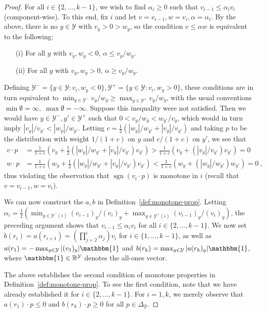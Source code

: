 \documentclass[11pt]{colt2019}
\newcommand{\reals}{\mathbb{R}}
\newcommand{\simplex}{\Delta_\Y}
\newcommand{\Y}{\mathcal{Y}}
\newcommand{\ones}{\mathbbm{1}}
\DeclareMathOperator*{\sgn}{sgn}
\begin{document}
\begin{proof}
  For all $i\in\{2,\ldots,k-1\}$, we wish to find $\alpha_i \geq 0$ such that $v_{i-1} \leq \alpha_i v_i$ (component-wise).
  To this end, fix $i$ and let $v = v_{i-1}, w = v_{i}, \alpha=\alpha_i$.
  By the above, there is no $y\in\Y$ with $v_y > 0 > w_y$, so the condition $v \leq \alpha w$ is equivalent to the following:
  \begin{enumerate}
  \item[(i)] For all $y$ with $v_y,w_y < 0$, $\alpha \leq v_y/w_y$.
  \item[(ii)] For all $y$ with $v_y,w_y > 0$, $\alpha \geq v_y/w_y$.
  \end{enumerate}
  Defining $\Y^- = \{y\in\Y: v_i,w_y < 0\}, \Y^+ = \{y\in\Y: v_i,w_y > 0\}$, these conditions are in turn equivalent to $\min_{y\in\Y^-} v_y/w_y \geq \max_{y\in\Y^+} v_y/w_y$, with the usual conventions $\min \emptyset = \infty,\; \max \emptyset = -\infty$.
  Suppose this inequality were not satisfied.
  Then we would have $y \in \Y^-,y'\in\Y^+$ such that $0 < v_y/w_y < w_{y'}/v_y$, which would in turn imply $|v_y|/v_{y'} < |w_y| / w_{y'}$.
  Letting $c = \tfrac 1 2 \left(|w_y| / w_{y'} + |v_y|/v_{y'}\right)$ and taking $p$ to be the distribution with weight $1/(1+c)$ on $y$ and $c/(1+c)$ on $y'$, we see that
  \begin{align*}
    v \cdot p &= \frac 1 {1+c} \left(v_y + \tfrac 1 2 (|w_y| / w_{y'} + |v_y|/v_{y'})v_{y'}\right) > \frac 1 {1+c} \left(v_y + (|v_y|/v_{y'})v_{y'}\right) = 0
    \\
    w \cdot p &= \frac 1 {1+c} \left(w_y + \tfrac 1 2 (|w_y| / w_{y'} + |v_y|/v_{y'})v_{y'}\right) < \frac 1 {1+c} \left(w_y + (|w_y|/w_{y'})w_{y'}\right) = 0~,
  \end{align*}
  thus violating the observation that $\sgn(v_i\cdot p)$ is monotone in $i$ (recall that $v = v_{i-1}, w = v_{i}$).

  We can now construct the $a,b$ in Definition~\ref{def:monotone-prop}.
  Letting $\alpha_i = \tfrac 1 2 \left(\min_{y\in\Y^-(i)} (v_{i-1})_y/(v_{i})_y + \max_{y\in\Y^+(i)} (v_{i-1})_y/(v_{i})_y\right)$, the preceding argument shows that $v_{i-1} \leq \alpha_i v_{i}$ for all $i \in \{2,\ldots,k-1\}$.
  We now set $b(r_i) = a(r_{i+1}) = (\prod_{j=2}^i \alpha_j) v_i$ for $i\in\{1,\ldots,k-1\}$, as well as $a(r_1) = -\max_{y\in\Y} |(v_1)_y|\ones$ and $b(r_k) = \max_{y\in\Y} |a(r_k)_y|\ones$, where $\ones\in\reals^\Y$ denotes the all-ones vector.

  The above establishes the second condition of monotone properties in Definition~\ref{def:monotone-prop}.
  To see the first condition, note that we have already established it for $i\in\{2,\ldots,k-1\}$.
  For $i=1,k$, we merely observe that $a(r_1) \cdot p \leq 0$ and $b(r_k) \cdot p \geq 0$ for all $p\in\simplex$.
\end{proof}
\end{document}
